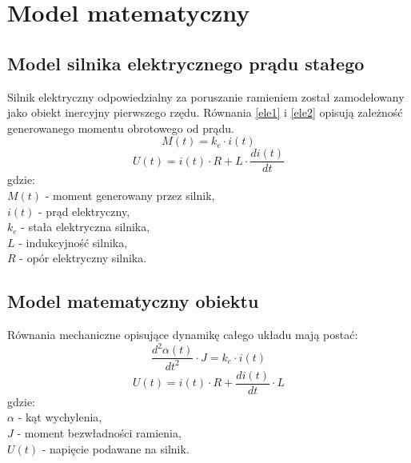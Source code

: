 \chapter{Model matematyczny}
\label{cha:model_matematyczny}

\section{Model silnika elektrycznego prądu stałego}
Silnik elektryczny odpowiedzialny za poruszanie ramieniem został zamodelowany jako obiekt inercyjny pierwszego rzędu. Równania \ref{ele1} i \ref{ele2} opisują zależność generowanego momentu obrotowego od prądu.
\begin{equation}\label{ele1}
M(t) = k_e \cdot i(t)
\end{equation}
\begin{equation}\label{ele2}
U(t) = i(t) \cdot R + L \cdot \frac{di(t)}{dt}
\end{equation}
\noindent gdzie:\\
$M(t)$ - moment generowany przez silnik,\\
$i(t)$ - prąd elektryczny,\\
$k_e$ - stała elektryczna silnika,\\
$L$ - indukcyjność silnika,\\
\(R\) - opór elektryczny silnika.

\section{Model matematyczny obiektu}
Równania mechaniczne opisujące dynamikę całego układu mają postać:\\
\begin{equation}\label{r1}
\frac{d^2 \alpha(t)}{dt^2} \cdot J = k_e \cdot i(t) 
\end{equation}
\begin{equation}\label{r2}
U(t) = i(t) \cdot R + \frac{d i(t)}{dt} \cdot L
\end{equation}
gdzie:\\
$\alpha$ - kąt wychylenia,\\
$J$ - moment bezwładności ramienia,\\
$U(t)$ - napięcie podawane na silnik.\\

